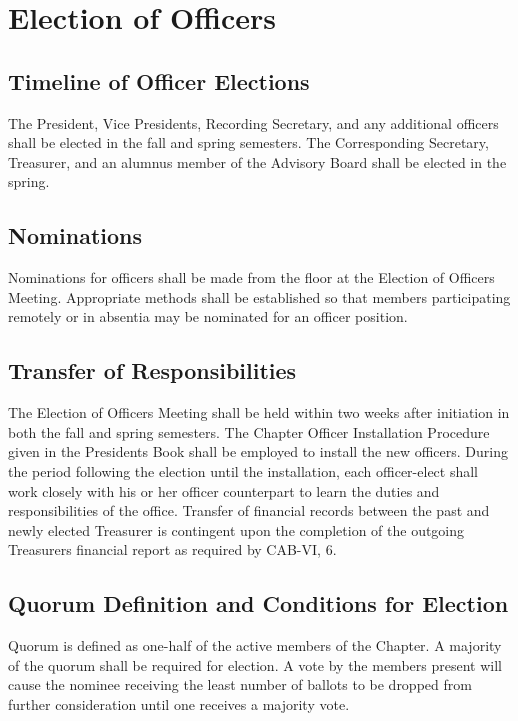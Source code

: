 \documentclass{article}
\begin{document}
	\section {Election of Officers}
	\subsection{Timeline of Officer Elections}
	The President, Vice Presidents, Recording Secretary, and any additional officers shall be elected in the fall and spring semesters. The Corresponding Secretary, Treasurer, and an alumnus member of the Advisory Board shall be elected in the spring.
	
	\subsection{Nominations}
	Nominations for officers shall be made from the floor at the Election of Officers Meeting. Appropriate methods shall be established so that members participating remotely or in absentia may be nominated for an officer position. %
	
	\subsection{Transfer of Responsibilities}
	The Election of Officers Meeting shall be held within two weeks after initiation in both the fall and spring semesters. The Chapter Officer Installation Procedure given in the President\textquotesingle s Book shall be employed to install the new officers. During the period following the election until the installation, each officer-elect shall work closely with his or her officer counterpart to learn the duties and responsibilities of the office. Transfer of financial records between the past and newly elected Treasurer is contingent upon the completion of the outgoing Treasurer\textquotesingle s financial report as required by CAB-VI, 6.
	
	\subsection{Quorum Definition and Conditions for Election}
	Quorum is defined as one-half of the active members of the Chapter.	A majority of the quorum shall be required for election. A vote by the members present will cause the nominee receiving the least number of ballots to be dropped from further consideration until one receives a majority vote.
	
\end{document}

